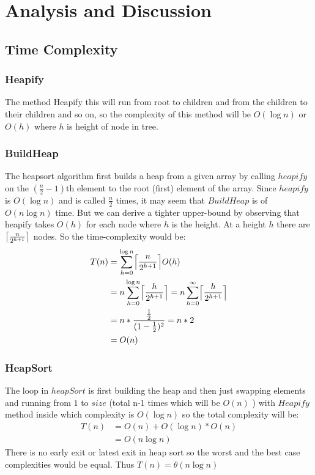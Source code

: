 \documentclass[letterpaper, 11 pt, conference]{ieeeconf}  %
\DeclarePairedDelimiter{\ceil}{\lceil}{\rceil}                                                          %
\begin{document}
\section{Analysis and Discussion}
\subsection{Time Complexity}
\subsubsection{Heapify}
The method Heapify this will run from root to children and from the children to their children and so on, so the complexity of this method will be $O(\log n)$ or $O(h)$ where $h$ is height of node in tree.


\subsubsection{BuildHeap}
The heapsort algorithm first builds a heap from a given array by calling $heapify$ on the $(\frac{n}{2} - 1)$th element to the root (first) element of the array. Since $heapify$ is $O(\log n)$ and is called $\frac{n}{2}$ times, it may seem that $BuildHeap$ is of $O(n\log n)$ time. But we can derive a tighter upper-bound by observing that heapify takes $O(h)$ for each node where $h$ is the height. At a height $h$ there are$ \ceil[\big]{\frac{n}{2^{h+1}}}$ nodes. So the time-complexity would be:
\begin{align*}
T(n) &= \sum_{h=0}^{\log{n}} \ceil[\Big]{\frac{n}{2^{h+1}}} O(h)\\
&= n \sum_{h=0}^{\log{n}} \ceil[\Big]{\frac{h}{2^{h+1}}} = n \sum_{h=0}^{\infty} \ceil[\Big]{\frac{h}{2^{h+1}}} \\
&= n *\frac{\frac{1}{2}}{(1-\frac{1}{2})^2} = n * 2\\
&= O(n)
\end{align*}

\subsubsection{HeapSort}
The loop in $heapSort$ is first building the heap and then just swapping elements and running from $1$ to $size$ (total n-1 times which will be $O(n)$ ) with $Heapify$ method inside which complexity is $O(\log n)$ so the total complexity will be:
\begin{align*}
T(n) &= O(n) + O(\log n)*O(n) \\ 
&= O(n\log n)
\end{align*}
There is no early exit or latest exit in heap sort so the worst and the best case complexities would be equal. Thus $T(n) = \theta (n \log n)$
\end{document}
